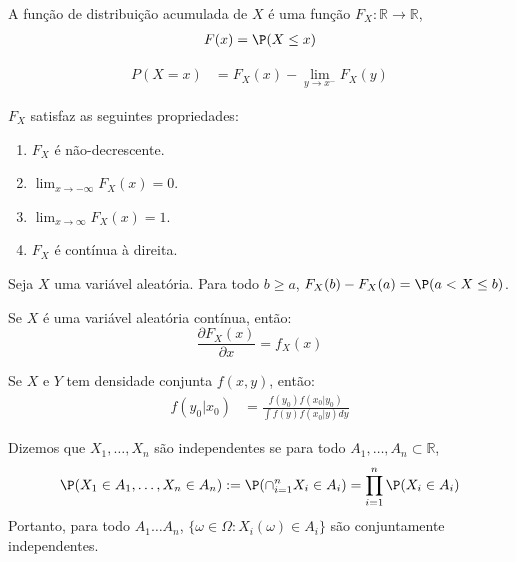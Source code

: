 \begin{definition}
 \label{cdf}
 A função de distribuição acumulada de $X$ é uma função $F_{X}: \mathbb{R} \rightarrow \mathbb{R}$,
 \begin{align*}
  F(x) = \P(X \leq x)
 \end{align*}
\end{definition}

\begin{lemma}
 \begin{align*}
  P(X=x)	&= F_{X}(x) - \lim_{y \rightarrow x^{-}}F_{X}(y)
 \end{align*}
\end{lemma}
     
\begin{lemma}
 $F_{X}$ satisfaz as seguintes propriedades:
 \begin{enumerate}
  \item $F_{X}$ é não-decrescente.
	\item $\lim_{x \rightarrow -\infty}F_{X}(x) = 0$.
	\item $\lim_{x \rightarrow \infty}F_{X}(x) = 1$.
	\item $F_{X}$ é contínua à direita.
 \end{enumerate}
\end{lemma}
	
\begin{lemma}
 Seja $X$ uma variável aleatória. Para todo $b \geq a$, $F_{X}(b)-F_{X}(a) = \P(a < X \leq b)$.
\end{lemma}

\begin{lemma}
 \label{cdf-derivative}
 Se $X$ é uma variável aleatória contínua, então:
 \[ \frac{\partial F_{X}(x)}{\partial x} = f_{X}(x) \]
\end{lemma}

\begin{theorem}
 \label{bayes-va}
 Se $X$ e $Y$ tem densidade conjunta $f(x,y)$, então:
 \begin{align*}
  f(y_{0}|x_{0})	&= \frac{f(y_{0})f(x_{0}|y_{0})}{\int{f(y)f(x_{0}|y)dy}}
 \end{align*}
\end{theorem}

\begin{definition}
 \label{def::independence}
 Dizemos que $X_{1}, \ldots, X_{n}$ são independentes se para todo $A_{1}, \ldots, A_{n} \subset \mathbb{R}$,
 \[ \P(X_{1} \in A_{1},\ldots,X_{n} \in A_{n}) := \P(\cap_{i=1}^{n}{X_{i} \in A_{i}}) = \prod_{i=1}^{n}{\P(X_{i} \in A_{i})} \] 
 Portanto, para todo $A_{1} \ldots A_{n}$, $\{\omega \in \Omega : X_{i}(\omega) \in A_{i}\}$ são conjuntamente independentes.
\end{definition}

